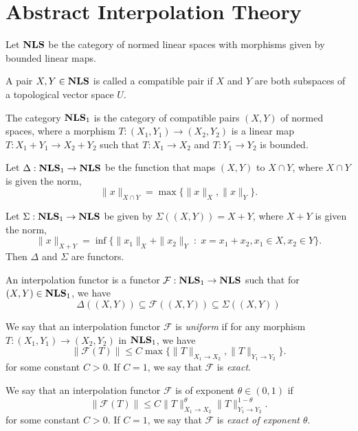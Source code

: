 \section{Abstract Interpolation Theory}
Let $\mathrm{\mathbf{NLS}}$ be the category of normed linear spaces with morphisms
given by bounded linear maps.

\begin{definition}
    A pair $X,Y \in \mathrm{\mathbf{NLS}}$ is called a compatible pair if $X$ and $Y$
    are both subspaces of a topological vector space $U$.
\end{definition}

\begin{definition}
    The category $\mathrm{\mathbf{NLS}}_1$ is the category of compatible pairs $(X,Y)$ of
    normed spaces, where a morphism $T:(X_1,Y_1)\rightarrow (X_2,Y_2)$
    is a linear map $T:X_1+Y_1\rightarrow X_2+Y_2$ such that $T:X_1\rightarrow X_2$
    and $T:Y_1\rightarrow Y_2$ is bounded.
\end{definition}

\begin{proposition}
    Let $\Delta:\mathrm{\mathbf{NLS}}_1\rightarrow\mathrm{\mathbf{NLS}}$ be the function that maps $(X,Y)$
    to $X\cap Y$, where $X \cap Y$ is given the norm,
    \begin{equation*}
        \|x\|_{X \cap Y} = \max\{\|x\|_X,\|x\|_Y\}.
    \end{equation*}
        
    Let $\Sigma:\mathrm{\mathbf{NLS}}_1\rightarrow\mathrm{\mathbf{NLS}}$ be given by $\Sigma((X,Y)) = X+Y$,
    where $X+Y$
    is given the norm,
    \begin{equation*}
        \|x\|_{X+Y} = \inf\{ \|x_1\|_X+\|x_2\|_Y \;:\;x = x_1+x_2,x_1 \in X,x_2 \in Y\}.
    \end{equation*}
    Then $\Delta$ and $\Sigma$ are functors. 
\end{proposition}

\begin{definition}
    An interpolation functor is a functor $\mathcal{F}:\mathrm{\mathbf{NLS}}_1\rightarrow\mathrm{\mathbf{NLS}}$
    such that for $(X,Y) \in \mathrm{\mathbf{NLS}}_1$, we have 
    \begin{equation*}
        \Delta((X,Y)) \subseteq \mathcal{F}((X,Y)) \subseteq \Sigma((X,Y))
    \end{equation*}


We say that an interpolation functor $\mathcal{F}$
is \emph{uniform} if for any morphism $T:(X_1,Y_1)\rightarrow (X_2,Y_2)$ in $\mathrm{\mathbf{NLS}}_1$,
we have
\begin{equation*}
    \|\mathcal{F}(T)\| \leq C\max\{\|T\|_{X_1\rightarrow X_2},\|T\|_{Y_1\rightarrow Y_2}\}.
\end{equation*}
for some constant $C > 0$. If $C = 1$, we say that $\mathcal{F}$ is \emph{exact}.

We say that an interpolation functor $\mathcal{F}$ is of exponent $\theta \in (0,1)$
if
\begin{equation*}
    \|\mathcal{F}(T)\| \leq C\|T\|_{X_1\rightarrow X_2}^\theta \|T\|_{Y_1\rightarrow Y_2}^{1-\theta}.
\end{equation*}
for some constant $C > 0$. If $C = 1$, we say that $\mathcal{F}$ is \emph{exact
of exponent $\theta$}.

\end{definition}

